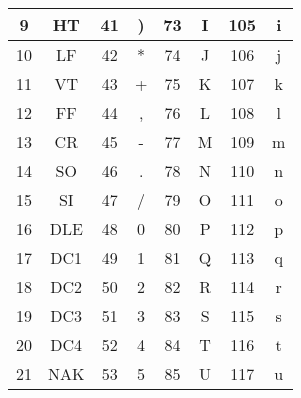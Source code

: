 \begin{longtable}{|c|c|c|c|c|c|c|c|}
	\hline
	9              & HT            & 41             & )             & 73             & I                      & 105            & i                      \\
	\hline
	10             & LF            & 42             & *             & 74             & J                      & 106            & j                      \\
	\hline
	11             & VT            & 43             & +             & 75             & K                      & 107            & k                      \\
	\hline
	12             & FF            & 44             & ,             & 76             & L                      & 108            & l                      \\
	\hline
	13             & CR            & 45             & -             & 77             & M                      & 109            & m                      \\
	\hline
	14             & SO            & 46             & .             & 78             & N                      & 110            & n                      \\
	\hline
	15             & SI            & 47             & /             & 79             & O                      & 111            & o                      \\
	\hline
	16             & DLE           & 48             & 0             & 80             & P                      & 112            & p                      \\
	\hline
	17             & DC1           & 49             & 1             & 81             & Q                      & 113            & q                      \\
	\hline
	18             & DC2           & 50             & 2             & 82             & R                      & 114            & r                      \\
	\hline
	19             & DC3           & 51             & 3             & 83             & S                      & 115            & s                      \\
	\hline
	20             & DC4           & 52             & 4             & 84             & T                      & 116            & t                      \\
	\hline
	21             & NAK           & 53             & 5             & 85             & U                      & 117            & u                      \\

\end{longtable}
